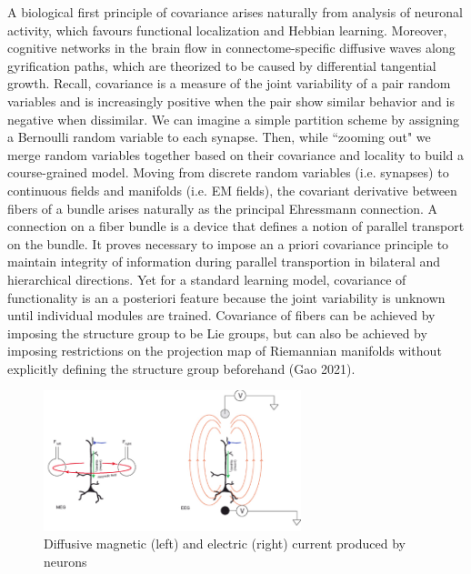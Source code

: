 \documentclass{article}
\begin{document}
   A biological first principle of covariance arises naturally from analysis of neuronal activity, which favours functional localization and Hebbian learning.
    Moreover, cognitive networks in the brain flow in connectome-specific diffusive waves along gyrification paths, which are theorized to be caused by differential tangential growth. 
    Recall, covariance is a measure of the joint variability of a pair random variables and is increasingly positive when the pair show similar behavior and is negative when dissimilar.
     We can imagine a simple partition scheme by  assigning a Bernoulli random variable to each synapse. Then, while ``zooming out" we merge random variables together based on their covariance and locality to build a course-grained model.
    Moving from discrete random variables (i.e. synapses) to continuous fields and manifolds (i.e. EM fields), the covariant derivative between fibers of a bundle arises naturally as the principal Ehressmann connection. 
    A connection on a fiber bundle is a device that defines a notion of parallel transport on the bundle.
    It proves necessary to impose an a priori covariance principle to maintain integrity of information during parallel transportion in bilateral and hierarchical directions.
    Yet for a standard learning model, covariance of functionality is an a posteriori feature because the joint variability is unknown until individual modules are trained. 
    Covariance of fibers can be achieved by imposing the structure group to be Lie groups, but can also be achieved by imposing restrictions on the projection map of Riemannian manifolds without explicitly defining the structure group beforehand (Gao 2021).

    \vspace{-0.5cm}
    \begin{figure}[h]
        \centering
        \includegraphics[width=7.5cm]{eeg-meg-neuron.png}
        \\ Diffusive magnetic (left) and electric (right) current produced by neurons
    \end{figure}
    
\end{document}
